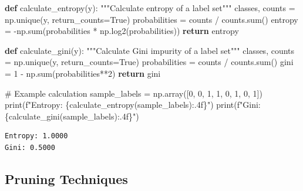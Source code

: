 \documentclass[
  letterpaper,
  DIV=11,
  numbers=noendperiod]{scrreprt}
\newenvironment{Shaded}{\begin{snugshade}}{\end{snugshade}}
\newcommand{\BuiltInTok}[1]{\textcolor[rgb]{0.00,0.23,0.31}{#1}}
\newcommand{\CommentTok}[1]{\textcolor[rgb]{0.37,0.37,0.37}{#1}}
\newcommand{\ControlFlowTok}[1]{\textcolor[rgb]{0.00,0.23,0.31}{\textbf{#1}}}
\newcommand{\DecValTok}[1]{\textcolor[rgb]{0.68,0.00,0.00}{#1}}
\newcommand{\KeywordTok}[1]{\textcolor[rgb]{0.00,0.23,0.31}{\textbf{#1}}}
\newcommand{\NormalTok}[1]{\textcolor[rgb]{0.00,0.23,0.31}{#1}}
\newcommand{\OperatorTok}[1]{\textcolor[rgb]{0.37,0.37,0.37}{#1}}
\newcommand{\SpecialCharTok}[1]{\textcolor[rgb]{0.37,0.37,0.37}{#1}}
\newcommand{\SpecialStringTok}[1]{\textcolor[rgb]{0.13,0.47,0.30}{#1}}
\newcommand{\VariableTok}[1]{\textcolor[rgb]{0.07,0.07,0.07}{#1}}
\begin{document}
\begin{Shaded}
\begin{Highlighting}[]
\KeywordTok{def}\NormalTok{ calculate\_entropy(y):}
    \CommentTok{"""Calculate entropy of a label set"""}
\NormalTok{    classes, counts }\OperatorTok{=}\NormalTok{ np.unique(y, return\_counts}\OperatorTok{=}\VariableTok{True}\NormalTok{)}
\NormalTok{    probabilities }\OperatorTok{=}\NormalTok{ counts }\OperatorTok{/}\NormalTok{ counts.}\BuiltInTok{sum}\NormalTok{()}
\NormalTok{    entropy }\OperatorTok{=} \OperatorTok{{-}}\NormalTok{np.}\BuiltInTok{sum}\NormalTok{(probabilities }\OperatorTok{*}\NormalTok{ np.log2(probabilities))}
    \ControlFlowTok{return}\NormalTok{ entropy}

\KeywordTok{def}\NormalTok{ calculate\_gini(y):}
    \CommentTok{"""Calculate Gini impurity of a label set"""}
\NormalTok{    classes, counts }\OperatorTok{=}\NormalTok{ np.unique(y, return\_counts}\OperatorTok{=}\VariableTok{True}\NormalTok{)}
\NormalTok{    probabilities }\OperatorTok{=}\NormalTok{ counts }\OperatorTok{/}\NormalTok{ counts.}\BuiltInTok{sum}\NormalTok{()}
\NormalTok{    gini }\OperatorTok{=} \DecValTok{1} \OperatorTok{{-}}\NormalTok{ np.}\BuiltInTok{sum}\NormalTok{(probabilities}\OperatorTok{**}\DecValTok{2}\NormalTok{)}
    \ControlFlowTok{return}\NormalTok{ gini}

\CommentTok{\# Example calculation}
\NormalTok{sample\_labels }\OperatorTok{=}\NormalTok{ np.array([}\DecValTok{0}\NormalTok{, }\DecValTok{0}\NormalTok{, }\DecValTok{1}\NormalTok{, }\DecValTok{1}\NormalTok{, }\DecValTok{0}\NormalTok{, }\DecValTok{1}\NormalTok{, }\DecValTok{0}\NormalTok{, }\DecValTok{1}\NormalTok{])}
\BuiltInTok{print}\NormalTok{(}\SpecialStringTok{f"Entropy: }\SpecialCharTok{\{}\NormalTok{calculate\_entropy(sample\_labels)}\SpecialCharTok{:.4f\}}\SpecialStringTok{"}\NormalTok{)}
\BuiltInTok{print}\NormalTok{(}\SpecialStringTok{f"Gini: }\SpecialCharTok{\{}\NormalTok{calculate\_gini(sample\_labels)}\SpecialCharTok{:.4f\}}\SpecialStringTok{"}\NormalTok{)}
\end{Highlighting}
\end{Shaded}

\begin{verbatim}
Entropy: 1.0000
Gini: 0.5000
\end{verbatim}

\subsection{Pruning Techniques}\label{pruning-techniques}
\end{document}
